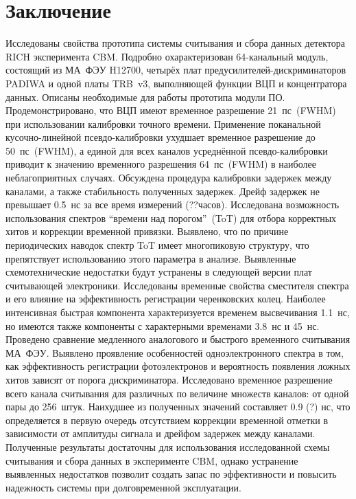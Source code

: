 \section*{Заключение}\label{sec:secSummary}

Исследованы свойства прототипа системы считывания и сбора данных детектора RICH эксперимента CBM. Подробно охарактеризован 64-канальный модуль, состоящий из МА~ФЭУ H12700, четырёх плат предусилителей-дискриминаторов PADIWA и одной платы TRB~v3, выполняющей функции ВЦП и концентратора данных. Описаны необходимые для работы прототипа модули ПО. Продемонстрировано, что ВЦП имеют временное разрешение 21~пс~(FWHM) при использовании калибровки точного времени. Применение поканальной кусочно-линейной псевдо-калибровки ухудшает временное разрешение до 50~пс~(FWHM), а единой для всех каналов усреднённой псевдо-калибровки приводит к значению временного разрешения 64~пс~(FWHM) в наиболее неблагоприятных случаях.
Обсуждена процедура калибровки задержек между каналами, а также стабильность полученных задержек. Дрейф задержек не превышает 0.5~нс за все время измерений (??часов). Исследована возможность использования спектров ``времени над порогом''~(ToT) для отбора корректных хитов и коррекции временной привязки. Выявлено, что по причине периодических наводок спектр ToT имеет многопиковую структуру, что препятствует использованию этого параметра в анализе. Выявленные схемотехнические недостатки будут устранены в следующей версии плат считывающей электроники. Исследованы временные свойства сместителя спектра и его влияние на эффективность регистрации черенковских колец. Наиболее интенсивная быстрая компонента характеризуется временем высвечивания 1.1~нс, но имеются также компоненты с характерными временами 3.8~нс и 45~нс. Проведено сравнение медленного аналогового и быстрого временного считывания МА~ФЭУ. Выявлено проявление особенностей одноэлектронного спектра в том, как эффективность регистрации фотоэлектронов и вероятность появления ложных хитов зависят от порога дискриминатора. Исследовано временное разрешение всего канала считывания для различных по величине множеств каналов: от одной пары до 256~штук. Наихудшее из полученных значений составляет 0.9 (?) нс, что определяется в первую очередь отсутствием коррекции временной отметки в зависимости от амплитуды сигнала и дрейфом задержек между каналами. Полученные результаты достаточны для использования исследованной схемы считывания и сбора данных в эксперименте CBM, однако устранение выявленных недостатков позволит создать запас по эффективности и повысить надежность системы при долговременной эксплуатации.

